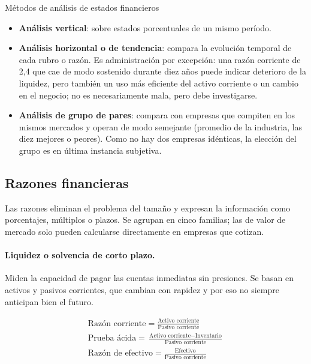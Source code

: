 \begin{definicion}{Métodos de análisis de estados financieros}
\begin{itemize}
\item \textbf{Análisis vertical}: sobre estados porcentuales de un mismo período.
\item \textbf{Análisis horizontal o de tendencia}: compara la evolución temporal de cada rubro o razón. Es administración por excepción: una razón corriente de 2,4 que cae de modo sostenido durante diez años puede indicar deterioro de la liquidez, pero también un uso más eficiente del activo corriente o un cambio en el negocio; no es necesariamente mala, pero debe investigarse.
\item \textbf{Análisis de grupo de pares}: compara con empresas que compiten en los mismos mercados y operan de modo semejante (promedio de la industria, las diez mejores o peores). Como no hay dos empresas idénticas, la elección del grupo es en última instancia subjetiva.
\end{itemize}
\end{definicion}

\subsection{Razones financieras}\label{sec:u2-ratios}

Las razones eliminan el problema del tamaño y expresan la información como porcentajes, múltiplos o plazos. Se agrupan en cinco familias; las de valor de mercado solo pueden calcularse directamente en empresas que cotizan.

\paragraph{Liquidez o solvencia de corto plazo.} Miden la capacidad de pagar las cuentas inmediatas sin presiones. Se basan en activos y pasivos corrientes, que cambian con rapidez y por eso no siempre anticipan bien el futuro.

\begin{formulaBox}
\[
\begin{gathered}
\text{Razón corriente} = \frac{\text{Activo corriente}}{\text{Pasivo corriente}}
\\[4pt]
\text{Prueba ácida} = \frac{\text{Activo corriente}-\text{Inventario}}{\text{Pasivo corriente}}
\\[4pt]
\text{Razón de efectivo} = \frac{\text{Efectivo}}{\text{Pasivo corriente}}
\end{gathered}
\]
\end{formulaBox}

